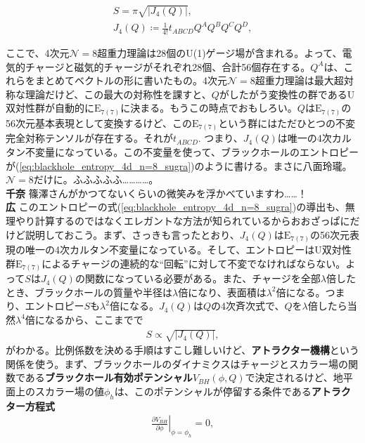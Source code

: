 \documentclass[paper=b5j,fontsize=12Q,jafontsize=12Q,baselineskip=21Q]{jlreq}
\DeclareRobustCommand{\hiron}{\textbf{広 }}
\DeclareRobustCommand{\chinan}{\textbf{千奈 }}
\begin{document}
\begin{refsection}
\begin{tcolorbox}
\begin{gather}
  S=\pi\sqrt{|J_4(Q)|},\label{eq:blackhole_entropy_4d_n=8_sugra}\\
  J_4(Q)\coloneqq\frac1{4!}t_{ABCD}Q^AQ^BQ^CQ^D,
\end{gather}
\end{tcolorbox}
ここで、4次元$\mathcal N=8$超重力理論は28個のU(1)ゲージ場が含まれる。よって、電気的チャージと磁気的チャージがそれぞれ28個、合計56個存在する。$Q^A$は、これらをまとめてベクトルの形に書いたもの。4次元$\mathcal N=8$超重力理論は最大超対称な理論だけど、この最大の対称性を課すと、$Q$がしたがう変換性の群であるU双対性群が自動的に$\mathrm E_{7(7)}$に決まる。もうこの時点でおもしろい。$Q$は$\mathrm E_{7(7)}$の56次元基本表現として変換するけど、この$\mathrm E_{7(7)}$という群にはただひとつの不変完全対称テンソルが存在する。それが$t_{ABCD}$. つまり、$J_4(Q)$は唯一の4次カルタン不変量になっている。この不変量を使って、ブラックホールのエントロピーが(\ref{eq:blackhole_entropy_4d_n=8_sugra})のように書ける。まさに八面玲瓏。$\mathcal N=8$だけに。ふふふふふ…………。
\\\chinan 篠澤さんがかつてないくらいの微笑みを浮かべていますわ……！
\\\hiron このエントロピーの式(\ref{eq:blackhole_entropy_4d_n=8_sugra})の導出も、無理やり計算するのではなくエレガントな方法が知られているからおおざっぱにだけど説明しておこう。まず、さっきも言ったとおり、$J_4(Q)$は$\mathrm{E}_{7(7)}$の56次元表現の唯一の4次カルタン不変量になっている。そして、エントロピーはU双対性群$\mathrm{E}_{7(7)}$によるチャージの連続的な``回転''に対して不変でなければならない。よって$S$は$J_4(Q)$の関数になっている必要がある。また、チャージを全部$\lambda$倍したとき、ブラックホールの質量や半径は$\lambda$倍になり、表面積は$\lambda^2$倍になる。つまり、エントロピー$S$も$\lambda^2$倍になる。$J_4(Q)$は$Q$の4次斉次式で、$Q$を$\lambda$倍したら当然$\lambda^4$倍になるから、ここまでで
\begin{align}
  S\propto\sqrt{|J_4(Q)|},
\end{align}
がわかる。比例係数を決める手順はすこし難しいけど、\textbf{アトラクター機構}という関係を使う。まず、ブラックホールのダイナミクスはチャージとスカラー場の関数である\textbf{ブラックホール有効ポテンシャル}$V_{BH}(\phi, Q)$で決定されるけど、地平面上のスカラー場の値$\phi_h$は、このポテンシャルが停留する条件である\textbf{アトラクター方程式}
\begin{align}
  \left. \frac{\partial V_{BH}}{\partial \phi} \right|_{\phi = \phi_h} = 0,
\end{align}

\end{refsection}
\end{document}
